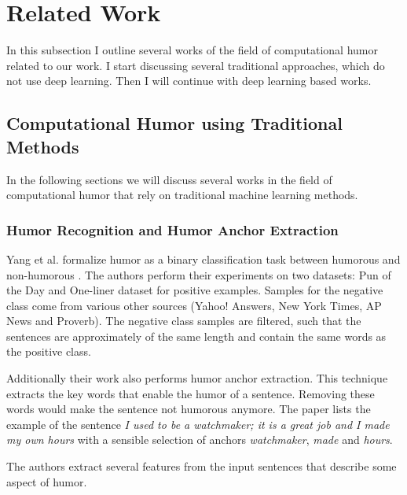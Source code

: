\documentclass[draft,final,oneside]{vutinfth} %
\begin{document}

\section{Related Work} \label{relatedworkbackground}

In this subsection I outline several works of the field of computational humor related to our work. I start discussing several traditional approaches, which do not use deep learning. Then I will continue with deep learning based works.


\subsection{Computational Humor using Traditional Methods}

In the following sections we will discuss several works in the field of computational humor that rely on traditional machine learning methods.

\subsubsection{Humor Recognition and Humor Anchor Extraction}

Yang et al. formalize humor as a binary classification task between humorous and non-humorous \cite{Yang2015HumorRA}. The authors perform their experiments on two datasets: Pun of the Day and One-liner dataset for positive examples. Samples for the negative class come from various other sources (Yahoo! Answers, New York Times, AP News and Proverb). The negative class samples are filtered, such that the sentences are approximately of the same length and contain the same words as the positive class.

Additionally their work also performs humor anchor extraction. This technique extracts the key words that enable the humor of a sentence. Removing these words would make the sentence not humorous anymore. The paper lists the example of the sentence \textit{I used to be a watchmaker; it is a great job and I made my own hours} with a sensible selection of anchors \textit{watchmaker}, \textit{made} and \textit{hours}.

The authors extract several features from the input sentences that describe some aspect of humor.
\end{document}
